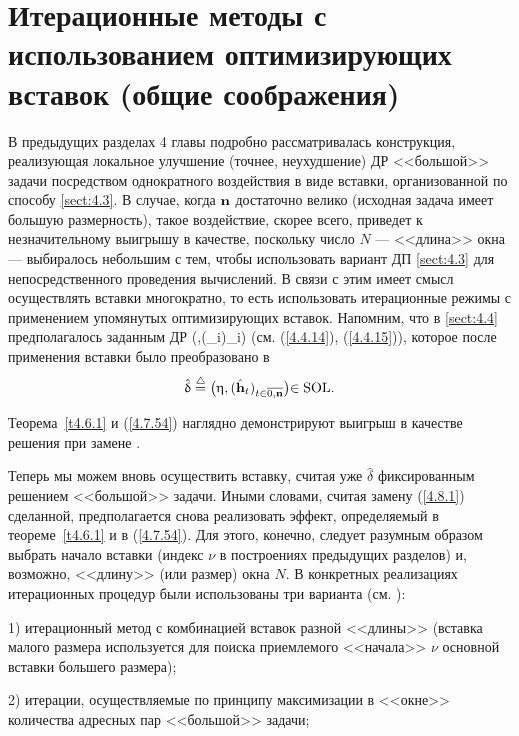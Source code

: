 
\section{
  Итерационные методы с использованием оптимизирующих вставок
  (общие соображения)
}
\label{sect:4.8}
\setcounter{equation}{-1}

В предыдущих разделах 4 главы подробно рассматривалась конструкция,
реализующая локальное улучшение
(точнее, неухудшение)
ДР <<большой>> задачи посредством однократного воздействия в виде вставки,
организованной по способу \ref{sect:4.3}.
В случае, когда ${\mathbf n}$ достаточно велико
(исходная задача имеет большую размерность),
такое воздействие, скорее всего,
приведет к незначительному выигрышу в качестве,
поскольку число $N$ --- <<длина>> окна ---
выбиралось небольшим с тем, чтобы использовать вариант ДП \ref{sect:4.3}
для непосредственного проведения вычислений.
В связи с этим имеет смысл  осуществлять вставки многократно,
то есть использовать итерационные режимы с применением
упомянутых оптимизирующих вставок.
Напомним, что в \ref{sect:4.4}
предполагалось заданным ДР
\bfn
  \label{4.8.0}
  \delta\df \bigl(\la,(_i)_{i\in{}}\bigl)\in {}
\efn
(см. (\ref{4.4.14}), (\ref{4.4.15})),
которое после применения вставки было преобразовано в
$$
  \hat{\delta}\df \bigl(\eta,(\hat{\mathbf{h}}_t)_{t\in\ov{0,\nn}}\bigl)\in \mathrm{SOL}
  .
$$

Теорема~\ref{t4.6.1} и
(\ref{4.7.54}) наглядно демонстрируют выигрыш в качестве решения при замене
\bfn
  \label{4.8.1}
  \delta \longrightarrow \hat{\delta}
  .
\efn

Теперь мы можем вновь осуществить вставку,
считая уже $\hat{\delta}$
фиксированным решением <<большой>> задачи.
Иными словами, считая замену (\ref{4.8.1}) сделанной,
предполагается снова реализовать эффект,
определяемый в теореме~\ref{t4.6.1} и в (\ref{4.7.54}).
Для этого, конечно,
следует разумным образом выбрать начало вставки
(индекс $\nu$ в построениях предыдущих разделов)
и, возможно, <<длину>> (или размер) окна $N.$
В конкретных реализациях итерационных процедур были
использованы три варианта (см. \cite{Cha18`}):

1) итерационный метод с комбинацией вставок разной <<длины>>
(вставка малого размера используется
для поиска приемлемого <<начала>> $\nu$
основной вставки большего размера);

2) итерации, осуществляемые  по принципу максимизации в <<окне>>
количества адресных пар <<большой>> задачи;

